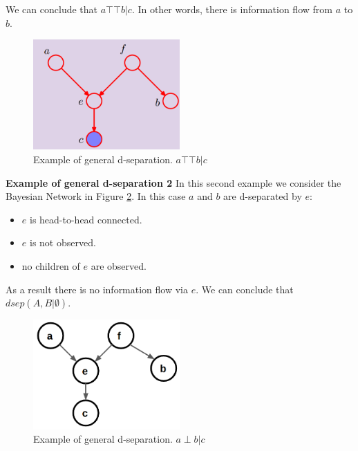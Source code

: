 We can conclude that $a \top\!\!\!\!\top b | c$. In other words, there is information
flow from $a$ to $b$.
\newline

\begin{figure}[H]
	\centering
	\includegraphics[width=0.5\textwidth]{
		images/08_BayesianNetworks_exampleGeneralDSeparation1.png
	}
	\caption{Example of general d-separation. $a \top\!\!\!\!\top b | c$ }
	\label{fig:exampleDSeparation1}
\end{figure}

\textbf{Example of general d-separation 2}
\newline
In this second example we consider the Bayesian Network in Figure \ref{fig:exampleDSeparation1.1}.
In this case $a$ and $b$ are d-separated by $e$:
\begin{itemize}
	\item $e$ is head-to-head connected.

	\item $e$ is not observed.

	\item no children of $e$ are observed.
\end{itemize}

As a result there is no information flow via $e$. We can conclude that $\mathit{dsep}
(A,B | \emptyset)$.
\newline

\begin{figure}[H]
	\centering
	\includegraphics[width=0.5\textwidth]{
		images/08_BayesianNetworks_exampleGeneralDSeparation1.1.png
	}
	\caption{Example of general d-separation. $a \perp b | c$ }
	\label{fig:exampleDSeparation1.1}
\end{figure}

